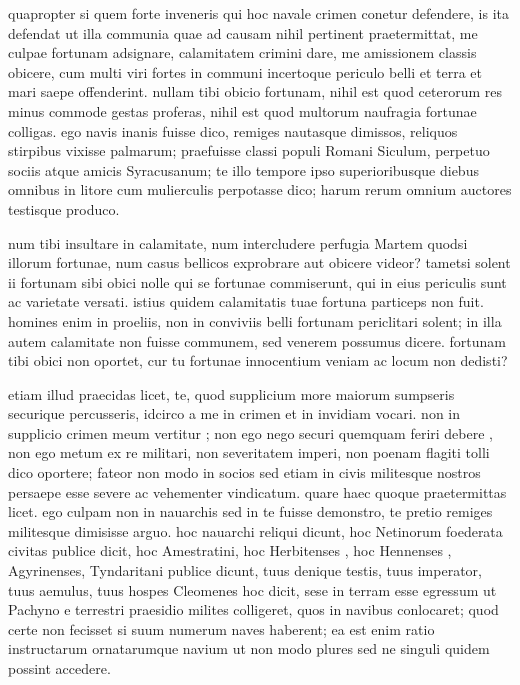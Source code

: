  quapropter si quem forte inveneris qui hoc navale crimen conetur defendere, is ita defendat ut illa communia quae ad causam nihil pertinent praetermittat, me culpae fortunam adsignare, calamitatem crimini dare, me amissionem classis obicere, cum multi viri fortes in communi incertoque periculo belli et terra et mari saepe offenderint. nullam tibi obicio fortunam, nihil est quod ceterorum res minus commode gestas proferas, nihil est quod multorum naufragia fortunae colligas. ego navis inanis fuisse dico, remiges nautasque dimissos, reliquos stirpibus vixisse palmarum; praefuisse classi populi Romani Siculum, perpetuo sociis atque amicis Syracusanum; te illo tempore ipso superioribusque diebus omnibus in litore cum mulierculis perpotasse dico; harum rerum omnium auctores testisque produco.

 num tibi insultare in calamitate, num intercludere perfugia Martem quodsi illorum fortunae, num casus bellicos exprobrare aut obicere videor? tametsi solent ii fortunam sibi obici nolle qui se fortunae commiserunt, qui in eius periculis sunt ac varietate versati. istius quidem calamitatis tuae fortuna particeps non fuit. homines enim in proeliis, non in conviviis belli fortunam periclitari solent; in illa autem calamitate non fuisse communem, sed venerem possumus dicere. fortunam tibi obici non oportet, cur tu fortunae innocentium veniam ac locum non dedisti?

 etiam illud praecidas licet, te, quod supplicium more maiorum sumpseris securique percusseris, idcirco a me in crimen et in invidiam vocari. non in supplicio crimen meum vertitur ; non ego nego securi quemquam feriri debere , non ego metum ex re militari, non severitatem imperi, non poenam flagiti tolli dico oportere; fateor non modo in socios sed etiam in civis militesque nostros persaepe esse severe ac vehementer vindicatum. quare haec quoque praetermittas licet. ego culpam non in nauarchis sed in te fuisse demonstro, te pretio remiges militesque dimisisse arguo. hoc nauarchi reliqui dicunt, hoc Netinorum foederata civitas publice dicit, hoc Amestratini, hoc Herbitenses , hoc Hennenses , Agyrinenses, Tyndaritani publice dicunt, tuus denique testis, tuus imperator, tuus aemulus, tuus hospes Cleomenes hoc dicit, sese in terram esse egressum ut Pachyno e terrestri praesidio milites colligeret, quos in navibus conlocaret; quod certe non fecisset si suum numerum naves haberent; ea est enim ratio instructarum ornatarumque navium ut non modo plures sed ne singuli quidem possint accedere.

